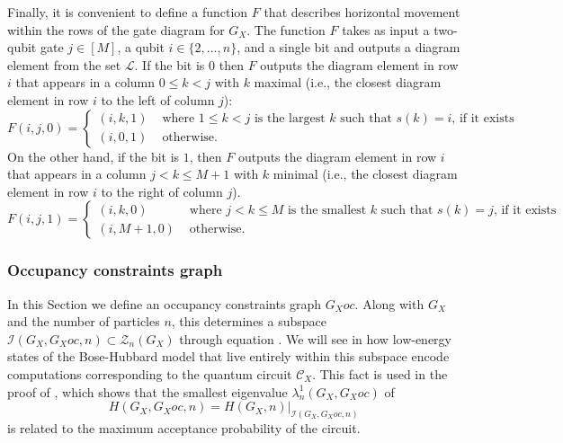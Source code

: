 \documentclass[../thesis-main/thesis-main]{subfiles}
\begin{document}
Finally, it is convenient to define a function $F$ that describes horizontal movement within the rows of the gate diagram for $G_X$. The function $F$ takes as input a two-qubit gate $j\in[M]$, a qubit $i\in\{2,\ldots,n\}$, and a single bit and outputs a diagram element from the set $\mathcal{L}$. If the bit is $0$ then $F$ outputs the diagram element in row $i$ that appears in a column $0\leq k<j$ with $k$ maximal (i.e., the closest diagram element in row $i$ to the left of column $j$):
\begin{equation}
F(i,j,0)=\begin{cases}
(i,k,1) & \text{ where }1\leq k<j\text{ is the largest }k\text{ such that }s(k)=i\text{, if it exists}\\
(i,0,1) & \text{ otherwise.}
\end{cases}\label{eq:F_bit0}
\end{equation}
On the other hand, if the bit is $1$, then $F$ outputs the diagram element in row $i$ that appears in a column $j<k\leq M+1$ with $k$ minimal (i.e., the closest diagram element in row $i$ to the right of column $j$). 
\begin{equation}
F(i,j,1)=\begin{cases}
(i,k,0) & \text{ where }j<k\leq M\text{ is the smallest }k\text{ such that }s(k)=j\text{, if it exists}\\
(i,M+1,0) & \text{ otherwise}.
\end{cases}\label{eq:F_bit1}
\end{equation}

\subsubsection{Occupancy constraints graph}

In this Section we define an occupancy constraints graph $G_Xoc$. Along with $G_X$ and the number of particles $n$, this determines a subspace $\mathcal{I}(G_X,G_Xoc,n)\subset\mathcal{Z}_{n}(G_X)$ through equation . We will see in  how low-energy states of the Bose-Hubbard model that live entirely within this subspace encode computations corresponding to the quantum circuit $\mathcal{C}_{X}$. This fact is used in the proof of , which shows that the smallest eigenvalue $\lambda_{n}^{1}(G_X,G_Xoc)$ of
\[
H(G_X,G_Xoc,n)=H(G_X,n)\big|_{\mathcal{I}(G_X,G_Xoc,n)}
\]
is related to the maximum acceptance probability of the circuit.
\end{document}
